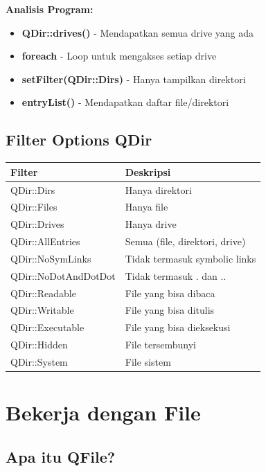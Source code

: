 \textbf{Analisis Program:}
\begin{itemize}
\item \textbf{QDir::drives()} - Mendapatkan semua drive yang ada
\item \textbf{foreach} - Loop untuk mengakses setiap drive
\item \textbf{setFilter(QDir::Dirs)} - Hanya tampilkan direktori
\item \textbf{entryList()} - Mendapatkan daftar file/direktori
\end{itemize}

\subsection{Filter Options QDir}

\begin{center}
\begin{tabular}{|l|l|}
\hline
\textbf{Filter} & \textbf{Deskripsi} \\
\hline
QDir::Dirs & Hanya direktori \\
\hline
QDir::Files & Hanya file \\
\hline
QDir::Drives & Hanya drive \\
\hline
QDir::AllEntries & Semua (file, direktori, drive) \\
\hline
QDir::NoSymLinks & Tidak termasuk symbolic links \\
\hline
QDir::NoDotAndDotDot & Tidak termasuk . dan .. \\
\hline
QDir::Readable & File yang bisa dibaca \\
\hline
QDir::Writable & File yang bisa ditulis \\
\hline
QDir::Executable & File yang bisa dieksekusi \\
\hline
QDir::Hidden & File tersembunyi \\
\hline
QDir::System & File sistem \\
\hline
\end{tabular}
\end{center}

\section{Bekerja dengan File}

\subsection{Apa itu QFile?}

